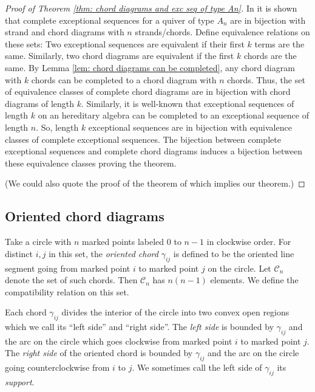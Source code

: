 \documentclass[11pt]{amsart}
\theoremstyle{definition}
\theoremstyle{remark}
\numberwithin{equation}{section}
\newcommand{\cC}{\ensuremath{{\mathcal{C}}}}
\begin{document}
\begin{proof}[Proof of Theorem \ref{thm: chord diagrams and exc seq of type An}]
In \cite{GIMO} it is shown that complete exceptional sequences for a quiver of type $A_n$ are in bijection with strand and chord diagrams with $n$ strands/chords. Define equivalence relations on these sets: Two exceptional sequences are equivalent if their first $k$ terms are the same. Similarly, two chord diagrams are equivalent if the first $k$ chords are the same. By Lemma \ref{lem: chord diagrams can be completed}, any chord diagram with $k$ chords can be completed to a chord diagram with $n$ chords. Thus, the set of equivalence classes of complete chord diagrams are in bijection with chord diagrams of length $k$. Similarly, it is well-known that exceptional sequences of length $k$ on an hereditary algebra can be completed to an exceptional sequence of length $n$. So, length $k$ exceptional sequences are in bijection with equivalence classes of complete exceptional sequences. The bijection between complete exceptional sequences and complete chord diagrams induces a bijection between these equivalence classes proving the theorem.

(We could also quote the proof of the theorem of \cite{GIMO} which implies our theorem.)
\end{proof}

\subsection{Oriented chord diagrams}\label{ss: oriented chord diagrams}

Take a circle with $n$ marked points labeled $0$ to $n-1$ in clockwise order. For distinct $i,j$ in this set, the \emph{oriented chord} $\gamma_{ij}$ is defined to be the oriented line segment going from marked point $i$ to marked point $j$ on the circle. Let $\cC_n$ denote the set of such chords. Then $\cC_n$ has $n(n-1)$ elements. We define the compatibility relation on this set.

Each chord $\gamma_{ij}$ divides the interior of the circle into two convex open regions which we call its ``left side'' and ``right side''. The \emph{left side} is bounded by $\gamma_{ij}$ and the arc on the circle which goes clockwise from marked point $i$ to marked point $j$. The \emph{right side} of the oriented chord is bounded by $\gamma_{ij}$ and the arc on the circle going counterclockwise from $i$ to $j$. We sometimes call the left side of $\gamma_{ij}$ its \emph{support}.
\end{document}

